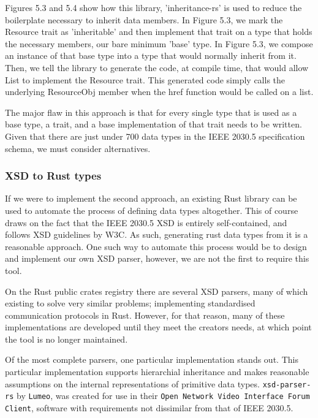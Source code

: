 Figures 5.3 and 5.4 show how this library, 'inheritance-rs' \cite[]{inheritancers} is used to reduce the boilerplate necessary to inherit data members. 
In Figure 5.3, we mark the Resource trait as 'inheritable' and then implement that trait on a type that holds the necessary members, our bare minimum 'base' type. 
In Figure 5.3, we compose an instance of that base type into a type that would normally inherit from it. Then, we tell the library to generate the code, at compile time, that would allow List to implement the Resource trait.
This generated code simply calls the underlying ResourceObj member when the href function would be called on a list.

The major flaw in this approach is that for every single type that is used as a base type, a trait, and a base implementation of that trait needs to be written.
Given that there are just under 700 data types in the IEEE 2030.5 specification schema, we must consider alternatives.


\subsubsection{XSD to Rust types}

If we were to implement the second approach, an existing Rust library can be used to automate the process of defining data types altogether.
This of course draws on the fact that the IEEE 2030.5 XSD is entirely self-contained, and follows XSD guidelines by W3C. As such, generating rust data types from it is a reasonable approach.
One such way to automate this process would be to design and implement our own XSD parser, however, we are not the first to require this tool. 

On the Rust public crates registry there are several XSD parsers, many of which existing to solve very similar problems; implementing standardised communication protocols in Rust.
However, for that reason, many of these implementations are developed until they meet the creators needs, at which point the tool is no longer maintained.

Of the most complete parsers, one particular implementation stands out. This particular implementation supports hierarchial inheritance and makes reasonable assumptions on the internal representations of primitive data types.
\texttt{xsd-parser-rs} by \texttt{Lumeo}, was created for use in their \texttt{Open Network Video Interface Forum Client}, software with requirements not dissimilar from that of IEEE 2030.5. \cite[]{xsdparserrs}

